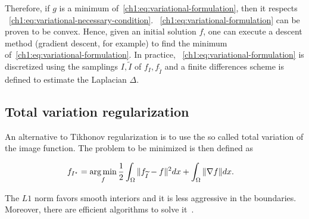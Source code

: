 Therefore, if $g$ is a minimum of~\cref{ch1:eq:variational-formulation}, then it respects ~\cref{ch1:eq:variational-necessary-condition}. ~\cref{ch1:eq:variational-formulation} can be proven to be convex. Hence, given an initial solution $f$, one can execute a descent method (gradient descent, for example) to find the minimum of~\cref{ch1:eq:variational-formulation}. In practice, ~\cref{ch1:eq:variational-formulation} is discretized using the samplings $I,\widetilde{I}$ of $f_I,f_{\widetilde{I}}$ and a finite differences scheme is defined to estimate the Laplacian $\Delta$.

\subsection{Total variation regularization}
An alternative to Tikhonov regularization is to use the so called total variation of the image function. The problem to be minimized is then defined as

\begin{align}
	f_{I^{\star}} &= \operatorname*{arg\,min}_{f} \frac{1}{2} \int_{\Omega}{ \lVert f_{\widetilde{I}} - f\rVert^2dx} + \int_{\Omega}{ \lVert\nabla f\rVert dx}.
\end{align}

The $L1$ norm favors smooth interiors and it is less aggressive in the boundaries. Moreover, there are efficient algorithms to solve it~\cite{rudin92,chambolle04,beck09}.

